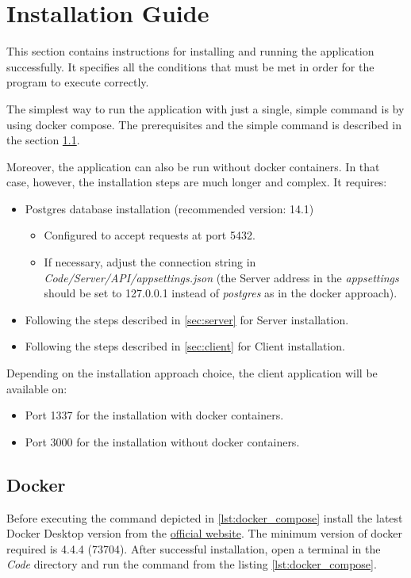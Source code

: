 \chapter{Installation Guide} \label{ch:installation_guide}

This section contains instructions for installing and running the application successfully. It specifies all the conditions that must be met in order for the program to execute correctly.

The simplest way to run the application with just a single, simple command is by using docker compose. The prerequisites and the simple command is described in the section \ref{sec:docker}. 

Moreover, the application can also be run without docker containers. In that case, however, the installation steps are much longer and complex. It requires: 
\begin{itemize}
    \item Postgres database installation (recommended version: 14.1)
    \begin{itemize}
        \item Configured to accept requests at port 5432.
        \item If necessary, adjust the connection string in \textit{Code\slash Server\slash API\slash appsettings.json} (the Server address in the \textit{appsettings} should be set to 127.0.0.1 instead of \textit{postgres} as in the docker approach).
    \end{itemize}
    \item Following the steps described in \ref{sec:server} for Server installation.
    \item Following the steps described in \ref{sec:client} for Client installation.
\end{itemize}

Depending on the installation approach choice, the client application will be available on:
\begin{itemize}
    \item Port 1337 for the installation with docker containers.
    \item Port 3000 for the installation without docker containers.
\end{itemize}

\section{Docker} \label{sec:docker}
Before executing the command depicted in \ref{lst:docker_compose} install the latest Docker Desktop version from the \href{https://www.docker.com/products/docker-desktop}{official website}. The minimum version of docker required is 4.4.4 (73704). After successful installation, open a terminal in the \textit{Code} directory and run the command from the listing \ref{lst:docker_compose}.\\

